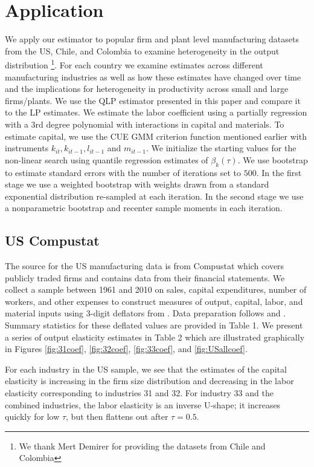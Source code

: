 \documentclass[11pt]{article}
\begin{document}
\section{Application} \label{application}
We apply our estimator to popular firm and plant level manufacturing datasets from the US, Chile, and Colombia to examine heterogeneity in the output distribution \footnote{We thank Mert Demirer for providing the datasets from Chile and Colombia}. For each country we examine estimates across different manufacturing industries as well as how these estimates have changed over time and the implications for heterogeneity in productivity across small and large firms/plants. We use the QLP estimator presented in this paper and compare it to the LP estimates. We estimate the labor coefficient using a partially regression with a 3rd degree polynomial with interactions in capital and materials. To estimate capital, we use the CUE GMM criterion function mentioned earlier with instruments $k_{it}, k_{it-1}, l_{it-1}$ and $m_{it-1}$. We initialize the starting values for the non-linear search using quantile regression estimates of $\beta_{k}(\tau)$. We use bootstrap to estimate standard errors with the number of iterations set to $500$. In the first stage we use a weighted bootstrap with weights drawn from a standard exponential distribution re-sampled at each iteration. In the second stage we use a nonparametric bootstrap and recenter sample moments in each iteration.

\subsection{US Compustat}
The source for the US manufacturing data is from Compustat which covers publicly traded firms and contains data from their financial statements. We collect a sample between 1961 and 2010 on sales, capital expenditures, number of workers, and other expenses to construct measures of output, capital, labor, and material inputs using 3-digit deflators from \cite{nber}. Data preparation follows \cite{Keller2009} and \cite{mert}. Summary statistics for these deflated values are provided in Table 1. We present a series of output elasticity estimates in Table 2 which are illustrated graphically in Figures \ref{fig:31coef}, \ref{fig:32coef}, \ref{fig:33coef}, and \ref{fig:USallcoef}.

For each industry in the US sample, we see that the estimates of the capital elasticity is increasing in the firm size distribution and decreasing in the labor elasticity corresponding to industries 31 and 32. For industry 33 and the combined industries, the labor elasticity is an inverse U-shape; it increases quickly for low $\tau$, but then flattens out after $\tau=0.5$.

\label{Tab:USsummary}

\end{document}
